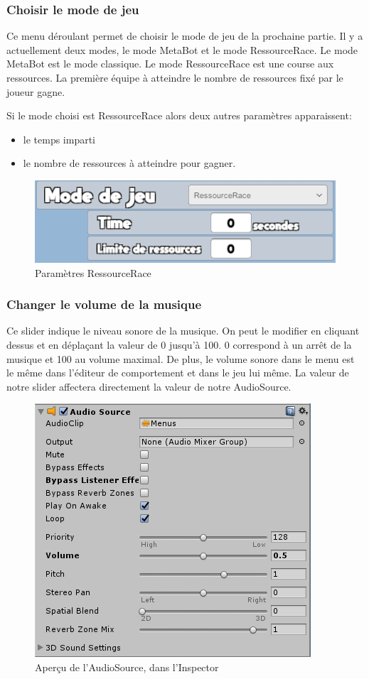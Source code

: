 \documentclass{report}
\begin{document}
\subsubsection{Choisir le mode de jeu}
Ce menu déroulant permet de choisir le mode de jeu de la prochaine partie. Il y a actuellement deux modes, le mode MetaBot et le mode RessourceRace. Le mode MetaBot est le mode classique. Le mode RessourceRace est une course aux ressources. La première équipe à atteindre le nombre de ressources fixé par le joueur gagne.

Si le mode choisi est RessourceRace alors deux autres paramètres apparaissent:
\begin{itemize}
\item le temps imparti
\item le nombre de ressources à atteindre pour gagner.
\end{itemize}

\begin{figure}[!h]
	\centering
		\includegraphics[scale=0.80]{ManuelJeu/ModeJeuRessourceRace}
	\caption{Paramètres RessourceRace}
\end{figure}

\subsubsection{Changer le volume de la musique}
Ce slider indique le niveau sonore de la musique. On peut le modifier en cliquant dessus et en déplaçant la valeur de 0 jusqu’à 100. 0 correspond à un arrêt de la musique et 100 au volume maximal. \newline
De plus, le volume sonore dans le menu est le même dans l'éditeur de comportement et dans le jeu lui même.
La valeur de notre slider affectera directement la valeur de notre AudioSource.
\smallbreak
\begin{figure}[h]
	\centering
		\includegraphics[scale=1]{AudioSource}
	\caption{Aperçu de l'AudioSource, dans l'Inspector}
\end{figure}
\end{document}
